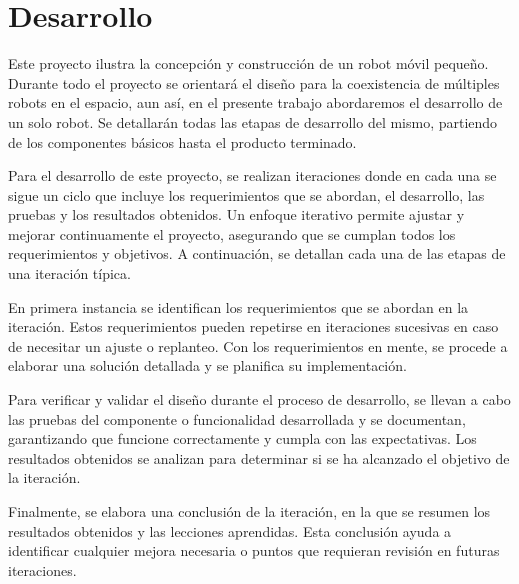 \newpage
\chapter{Desarrollo}

Este proyecto ilustra la concepción y construcción de un robot móvil pequeño. Durante todo el proyecto se orientará el diseño para la coexistencia de múltiples robots en el espacio, aun así, en el presente trabajo abordaremos el desarrollo de un solo robot.  Se detallarán todas las etapas de desarrollo del mismo, partiendo de los componentes básicos hasta el producto terminado.

Para el desarrollo de este proyecto, se realizan iteraciones donde en cada una se sigue un ciclo que incluye los requerimientos que se abordan, el desarrollo, las pruebas y los resultados obtenidos. Un enfoque iterativo permite ajustar y mejorar continuamente el proyecto, asegurando que se cumplan todos los requerimientos y objetivos. A continuación, se detallan cada una de las etapas de una iteración típica.

En primera instancia se identifican los requerimientos que se abordan en la iteración. Estos requerimientos pueden repetirse en iteraciones sucesivas en caso de necesitar un ajuste o replanteo. Con los requerimientos en mente, se procede a elaborar una solución detallada y se planifica su implementación.

Para verificar y validar el diseño durante el proceso de desarrollo, se llevan a cabo las pruebas del componente o funcionalidad desarrollada y se documentan, garantizando que funcione correctamente y cumpla con las expectativas. Los resultados obtenidos se analizan para determinar si se ha alcanzado el objetivo de la iteración.

Finalmente, se elabora una conclusión de la iteración, en la que se resumen los resultados obtenidos y las lecciones aprendidas. Esta conclusión ayuda a identificar cualquier mejora necesaria o puntos que requieran revisión en futuras iteraciones.













